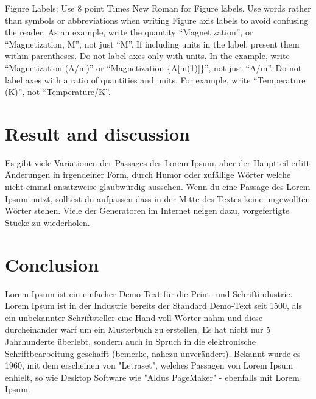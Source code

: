 \documentclass[conference]{IEEEtran}
\begin{document}
		Figure Labels: Use 8 point Times New Roman for Figure labels. Use words 
		rather than symbols or abbreviations when writing Figure axis labels to 
		avoid confusing the reader. As an example, write the quantity 
		``Magnetization'', or ``Magnetization, M'', not just ``M''. If including 
		units in the label, present them within parentheses. Do not label axes only 
		with units. In the example, write ``Magnetization (A/m)'' or ``Magnetization 
		\{A[m(1)]\}'', not just ``A/m''. Do not label axes with a ratio of 
		quantities and units. For example, write ``Temperature (K)'', not 
		``Temperature/K''.

\section{Result and discussion}
	Es gibt viele Variationen der Passages des Lorem Ipsum, aber der Hauptteil erlitt Änderungen in irgendeiner Form, durch Humor oder zufällige Wörter welche nicht einmal ansatzweise glaubwürdig aussehen. Wenn du eine Passage des Lorem Ipsum nutzt, solltest du aufpassen dass in der Mitte des Textes keine ungewollten Wörter stehen. Viele der Generatoren im Internet neigen dazu, vorgefertigte Stücke zu wiederholen.

\section{Conclusion}
	Lorem Ipsum ist ein einfacher Demo-Text für die Print- und Schriftindustrie. Lorem Ipsum ist in der Industrie bereits der Standard Demo-Text seit 1500, als ein unbekannter Schriftsteller eine Hand voll Wörter nahm und diese durcheinander warf um ein Musterbuch zu erstellen. Es hat nicht nur 5 Jahrhunderte überlebt, sondern auch in Spruch in die elektronische Schriftbearbeitung geschafft (bemerke, nahezu unverändert). Bekannt wurde es 1960, mit dem erscheinen von "Letraset", welches Passagen von Lorem Ipsum enhielt, so wie Desktop Software wie "Aldus PageMaker" - ebenfalls mit Lorem Ipsum.
	

\end{document}
